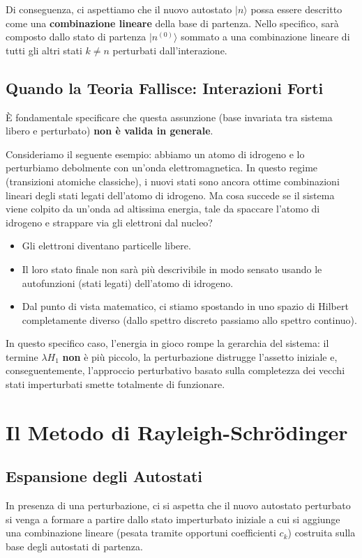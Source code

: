 Di conseguenza, ci aspettiamo che il nuovo autostato $\vert{}n\rangle$ possa essere descritto come una \textbf{combinazione lineare} della base di partenza. Nello specifico, sarà composto dallo stato di partenza $\vert{}n^{(0)}\rangle$ sommato a una combinazione lineare di tutti gli altri stati $k \neq n$ perturbati dall'interazione.

\subsection{Quando la Teoria Fallisce: Interazioni Forti}
È fondamentale specificare che questa assunzione (base invariata tra sistema libero e perturbato) \textbf{non è valida in generale}.

Consideriamo il seguente esempio: abbiamo un atomo di idrogeno e lo perturbiamo debolmente con un'onda elettromagnetica. In questo regime (transizioni atomiche classiche), i nuovi stati sono ancora ottime combinazioni lineari degli stati legati dell'atomo di idrogeno.
Ma cosa succede se il sistema viene colpito da un'onda ad altissima energia, tale da spaccare l'atomo di idrogeno e strappare via gli elettroni dal nucleo?
\begin{itemize}
\item Gli elettroni diventano particelle libere.
\item Il loro stato finale non sarà più descrivibile in modo sensato usando le autofunzioni (stati legati) dell'atomo di idrogeno.
\item Dal punto di vista matematico, ci stiamo spostando in uno spazio di Hilbert completamente diverso (dallo spettro discreto passiamo allo spettro continuo).
\end{itemize}
In questo specifico caso, l'energia in gioco rompe la gerarchia del sistema: il termine $\lambda H_1$ \textbf{non} è più piccolo, la perturbazione distrugge l'assetto iniziale e, conseguentemente, l'approccio perturbativo basato sulla completezza dei vecchi stati imperturbati smette totalmente di funzionare.

\section{Il Metodo di Rayleigh-Schrödinger}

\subsection{Espansione degli Autostati}
In presenza di una perturbazione, ci si aspetta che il nuovo autostato perturbato si venga a formare a partire dallo stato imperturbato iniziale a cui si aggiunge una combinazione lineare (pesata tramite opportuni coefficienti $c_k$) costruita sulla base degli autostati di partenza.


